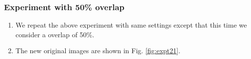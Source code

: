 \subsubsection{Experiment with 50\% overlap}
\begin{enumerate}
\item We repeat the above experiment with same settings except that this time we consider a overlap of 50\%.
\item The new original images are shown in Fig. \ref{fig:expt21}.

\begin{figure}[t!]
\hspace{-0.5in}
		\hspace{-1in}
\end{figure}
\end{enumerate}
